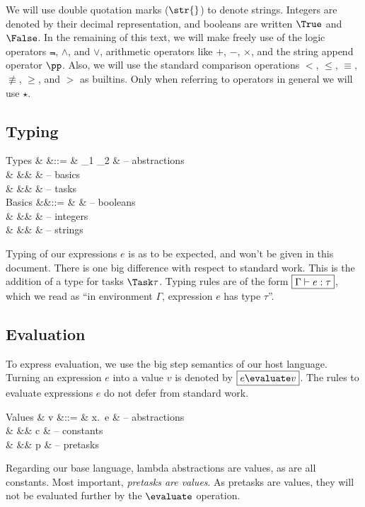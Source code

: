 We will use double quotation marks ($\str{}$) to denote strings.
Integers are denoted by their decimal representation,
and booleans are written $\True$ and $\False$.
In the remaining of this text,
we will make freely use of the logic operators $\Not$, $\land$, and $\lor$,
arithmetic operators like $+$, $-$, $\times$,
and the string append operator $\pp$.
Also, we will use the standard comparison operations $<$, $\le$, $\equiv$, $\nequiv$, $\ge$, and $>$
as builtins.
Only when referring to operators in general we will use $\star$.


\subsection{Typing}

\begin{grammar}
  Types
    & \tau &::= & \tau_1 \to \tau_2 & – abstractions \\
    &      &\mid& \beta             & – basics \\
    &      &\mid& \Task \tau        & – tasks \\
  Basics
    &\beta &::= & \Bool             & – booleans \\
    &      &\mid& \Int              & – integers \\
    &      &\mid& \String           & – strings \\
\end{grammar}
Typing of our expressions $e$ is as to be expected,
and won't be given in this document.
There is one big difference with respect to standard work.
This is the addition of a type for tasks $\Task \tau$.
Typing rules are of the form $\boxed{\Gamma \vdash e : \tau}$,
which we read as \enquote{in environment $\Gamma$, expression $e$ has type $\tau$}.


\subsection{Evaluation}

To express evaluation,
we use the big step semantics of our host language.
Turning an expression $e$ into a value $v$ is denoted by $\boxed{e \evaluate v}$.
The rules to evaluate expressions $e$ do not defer from standard work.

\begin{grammar}
  Values
    & v &::= & \lambda x.\ e  & – abstractions \\
    &   &\mid& c              & – constants \\
    &   &\mid& p              & – pretasks \\
\end{grammar}
Regarding our base language, lambda abstractions are values, as are all constants.
Most important, \emph{pretasks are values}.
As pretasks are values, they will not be evaluated further by the $\evaluate$ operation.
